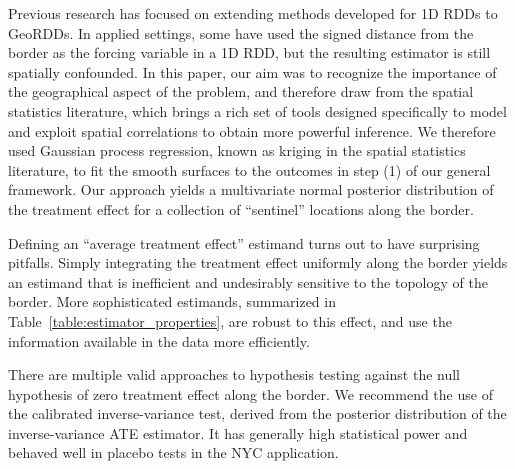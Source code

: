 \documentclass[letter]{article}
\begin{document}
Previous research has focused on extending methods developed for 1D RDDs to GeoRDDs.
In applied settings, some have used the signed distance from the border as the forcing variable in a 1D RDD, but the resulting estimator is still spatially confounded.
In this paper, our aim was to recognize the importance of the geographical aspect of the problem, and therefore draw from the spatial statistics literature, which brings a rich set of tools designed specifically to model and exploit spatial correlations to obtain more powerful inference.
We therefore used Gaussian process regression, known as kriging in the spatial statistics literature, to fit the smooth surfaces to the outcomes in step (1) of our general framework.
Our approach yields a multivariate normal posterior distribution of the treatment effect for a collection of ``sentinel'' locations along the border.
    


    	Defining an ``average treatment effect'' estimand turns out to have surprising pitfalls.
Simply integrating the treatment effect uniformly along the border yields an estimand that is inefficient and undesirably sensitive to the topology of the border.
More sophisticated estimands, summarized in Table~\ref{table:estimator_properties}, are robust to this effect, and use the information available in the data more efficiently.

There are multiple valid approaches to hypothesis testing against the null hypothesis of zero treatment effect along the border.
We recommend the use of the calibrated inverse-variance test, derived from the posterior distribution of the inverse-variance ATE estimator.
It has generally high statistical power and behaved well in placebo tests in the NYC application.
    
\end{document}

